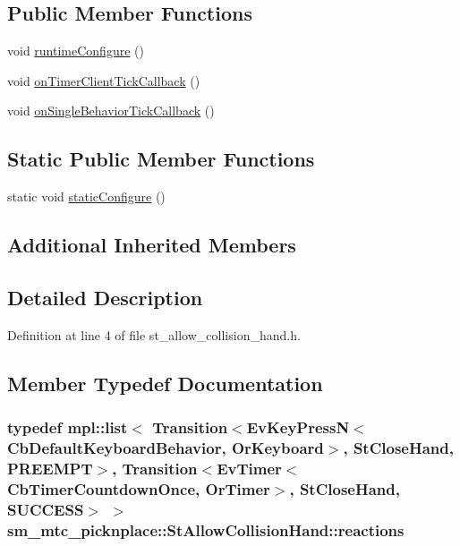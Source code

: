 \subsection*{Public Member Functions}
\begin{DoxyCompactItemize}
\item 
void \hyperlink{structsm__mtc__picknplace_1_1StAllowCollisionHand_a60077620e1e1c5fc54732a2aae2844ef}{runtime\+Configure} ()
\item 
void \hyperlink{structsm__mtc__picknplace_1_1StAllowCollisionHand_a2bdb0aec48af81da55f91a486d8f4559}{on\+Timer\+Client\+Tick\+Callback} ()
\item 
void \hyperlink{structsm__mtc__picknplace_1_1StAllowCollisionHand_a613e974b8c3070c6d8602b5628eaabb2}{on\+Single\+Behavior\+Tick\+Callback} ()
\end{DoxyCompactItemize}
\subsection*{Static Public Member Functions}
\begin{DoxyCompactItemize}
\item 
static void \hyperlink{structsm__mtc__picknplace_1_1StAllowCollisionHand_a2677cfe7091c94d3e7cd5ba0af4e52af}{static\+Configure} ()
\end{DoxyCompactItemize}
\subsection*{Additional Inherited Members}


\subsection{Detailed Description}


Definition at line 4 of file st\+\_\+allow\+\_\+collision\+\_\+hand.\+h.



\subsection{Member Typedef Documentation}
\subsubsection[{\texorpdfstring{reactions}{reactions}}]{\setlength{\rightskip}{0pt plus 5cm}typedef mpl\+::list$<$ Transition$<$Ev\+Key\+PressN$<$Cb\+Default\+Keyboard\+Behavior, {\bf Or\+Keyboard}$>$, {\bf St\+Close\+Hand}, {\bf P\+R\+E\+E\+M\+PT}$>$, Transition$<$Ev\+Timer$<$Cb\+Timer\+Countdown\+Once, {\bf Or\+Timer}$>$, {\bf St\+Close\+Hand}, {\bf S\+U\+C\+C\+E\+SS}$>$ $>$ {\bf sm\+\_\+mtc\+\_\+picknplace\+::\+St\+Allow\+Collision\+Hand\+::reactions}}\hypertarget{structsm__mtc__picknplace_1_1StAllowCollisionHand_a7513eaa99c015116994ceeb8a85f97ba}{}\label{structsm__mtc__picknplace_1_1StAllowCollisionHand_a7513eaa99c015116994ceeb8a85f97ba}


